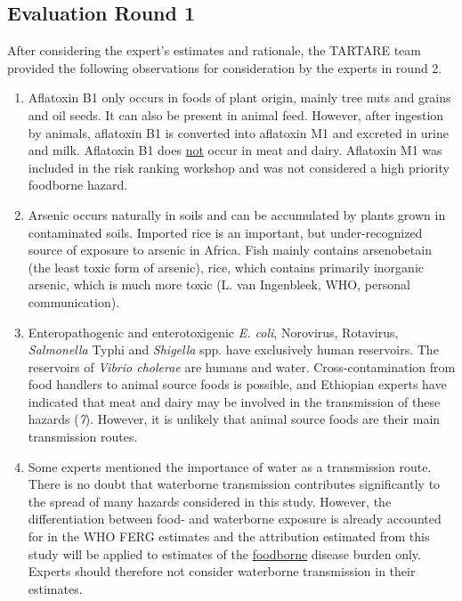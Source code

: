 \documentclass[
  letterpaper,
  DIV=11,
  numbers=noendperiod]{scrartcl}
\begin{document}
\subsection{Evaluation Round 1}\label{evaluation-round-1}

After considering the expert's estimates and rationale, the TARTARE team
provided the following observations for consideration by the experts in
round 2.

\begin{enumerate}
\def\labelenumi{\arabic{enumi}.}
\item
  Aflatoxin B1 only occurs in foods of plant origin, mainly tree nuts
  and grains and oil seeds. It can also be present in animal feed.
  However, after ingestion by animals, aflatoxin B1 is converted into
  aflatoxin M1 and excreted in urine and milk. Aflatoxin B1 does
  \ul{not} occur in meat and dairy. Aflatoxin M1 was included in the
  risk ranking workshop and was not considered a high priority foodborne
  hazard.
\item
  Arsenic occurs naturally in soils and can be accumulated by plants
  grown in contaminated soils. Imported rice is an important, but
  under-recognized source of exposure to arsenic in Africa. Fish mainly
  contains arsenobetain (the least toxic form of arsenic), rice, which
  contains primarily inorganic arsenic, which is much more toxic (L. van
  Ingenbleek, WHO, personal communication).
\item
  Enteropathogenic and enterotoxigenic \emph{E. coli}, Norovirus,
  Rotavirus, \emph{Salmonella} Typhi and \emph{Shigella} spp. have
  exclusively human reservoirs. The reservoirs of \emph{Vibrio cholerae}
  are humans and water. Cross-contamination from food handlers to animal
  source foods is possible, and Ethiopian experts have indicated that
  meat and dairy may be involved in the transmission of these hazards
  (\emph{7}). However, it is unlikely that animal source foods are their
  main transmission routes.
\item
  Some experts mentioned the importance of water as a transmission
  route. There is no doubt that waterborne transmission contributes
  significantly to the spread of many hazards considered in this study.
  However, the differentiation between food- and waterborne exposure is
  already accounted for in the WHO FERG estimates and the attribution
  estimated from this study will be applied to estimates of the
  \ul{foodborne} disease burden only. Experts should therefore not
  consider waterborne transmission in their estimates.
\end{enumerate}
\end{document}
